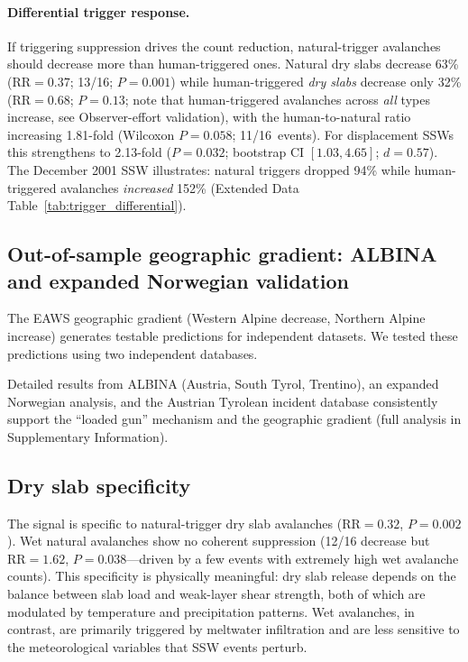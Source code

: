 \documentclass[11pt,letterpaper]{article}
\begin{document}
\paragraph{Differential trigger response.} If triggering suppression drives the count reduction, natural-trigger avalanches should decrease more than human-triggered ones. Natural dry slabs decrease 63\% ($\mathrm{RR} = 0.37$; 13/16; $P = 0.001$) while human-triggered \emph{dry slabs} decrease only 32\% ($\mathrm{RR} = 0.68$; $P = 0.13$; note that human-triggered avalanches across \emph{all} types increase, see Observer-effort validation), with the human-to-natural ratio increasing 1.81-fold (Wilcoxon $P = 0.058$; 11/16~events). For displacement SSWs this strengthens to 2.13-fold ($P = 0.032$; bootstrap CI $[1.03, 4.65]$; $d = 0.57$). The December 2001 SSW illustrates: natural triggers dropped 94\% while human-triggered avalanches \emph{increased} 152\% (Extended Data Table~\ref{tab:trigger_differential}).

\subsection*{Out-of-sample geographic gradient: ALBINA and expanded Norwegian validation}

The EAWS geographic gradient (Western Alpine decrease, Northern Alpine increase) generates testable predictions for independent datasets. We tested these predictions using two independent databases.

Detailed results from ALBINA (Austria, South Tyrol, Trentino), an expanded Norwegian analysis, and the Austrian Tyrolean incident database consistently support the ``loaded gun'' mechanism and the geographic gradient (full analysis in Supplementary Information).

\subsection*{Dry slab specificity}

The signal is specific to natural-trigger dry slab avalanches ($\mathrm{RR} = 0.32$, $P = 0.002$). Wet natural avalanches show no coherent suppression (12/16 decrease but $\mathrm{RR} = 1.62$, $P = 0.038$---driven by a few events with extremely high wet avalanche counts). This specificity is physically meaningful: dry slab release depends on the balance between slab load and weak-layer shear strength, both of which are modulated by temperature and precipitation patterns. Wet avalanches, in contrast, are primarily triggered by meltwater infiltration and are less sensitive to the meteorological variables that SSW events perturb.
\end{document}

